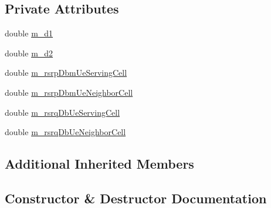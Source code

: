 \subsection*{Private Attributes}
\begin{DoxyCompactItemize}
\item 
double \hyperlink{classLteUeMeasurementsTestCase_a34e48f5e672722165a52dfe598fd4466}{m\+\_\+d1}
\item 
double \hyperlink{classLteUeMeasurementsTestCase_ad457745e25b7a52f7f9d9fa36d9c03ba}{m\+\_\+d2}
\item 
double \hyperlink{classLteUeMeasurementsTestCase_a5afd5051a96e8cd850511637ad12aa1d}{m\+\_\+rsrp\+Dbm\+Ue\+Serving\+Cell}
\item 
double \hyperlink{classLteUeMeasurementsTestCase_ae051cd902447ea3daf948f65718ca4b4}{m\+\_\+rsrp\+Dbm\+Ue\+Neighbor\+Cell}
\item 
double \hyperlink{classLteUeMeasurementsTestCase_a4f5cb7b7b1948192712b9df5cbba1e0b}{m\+\_\+rsrq\+Db\+Ue\+Serving\+Cell}
\item 
double \hyperlink{classLteUeMeasurementsTestCase_ac11f0c198f29818957516ebfe9c5853b}{m\+\_\+rsrq\+Db\+Ue\+Neighbor\+Cell}
\end{DoxyCompactItemize}
\subsection*{Additional Inherited Members}


\subsection{Constructor \& Destructor Documentation}
